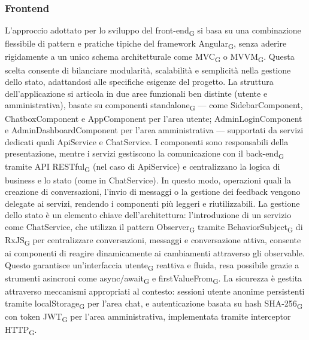 \subsubsection{Frontend}
L'approccio adottato per lo sviluppo del front-end\textsubscript{G} si basa su una combinazione flessibile di pattern e pratiche tipiche del framework Angular\textsubscript{G}, senza aderire rigidamente a un unico schema architetturale come MVC\textsubscript{G} o MVVM\textsubscript{G}. Questa scelta consente di bilanciare modularità, scalabilità e semplicità nella gestione dello stato, adattandosi alle specifiche esigenze del progetto. 
\newline \newline La struttura dell'applicazione si articola in due aree funzionali ben distinte (utente e amministrativa), basate su componenti standalone\textsubscript{G} — come SidebarComponent, ChatboxComponent e AppComponent per l'area utente; AdminLoginComponent e AdminDashboardComponent per l'area amministrativa — supportati da servizi dedicati quali ApiService e ChatService. I componenti sono responsabili della presentazione, mentre i servizi gestiscono la comunicazione con il back-end\textsubscript{G} tramite API RESTful\textsubscript{G} (nel caso di ApiService) e centralizzano la logica di business e lo stato (come in ChatService). 
\newline \newline In questo modo, operazioni quali la creazione di conversazioni, l'invio di messaggi o la gestione dei feedback vengono delegate ai servizi, rendendo i componenti più leggeri e riutilizzabili. La gestione dello stato è un elemento chiave dell'architettura: l'introduzione di un servizio come ChatService, che utilizza il pattern Observer\textsubscript{G} tramite BehaviorSubject\textsubscript{G} di RxJS\textsubscript{G} per centralizzare conversazioni, messaggi e conversazione attiva, consente ai componenti di reagire dinamicamente ai cambiamenti attraverso gli observable. Questo garantisce un'interfaccia utente\textsubscript{G} reattiva e fluida, resa possibile grazie a strumenti asincroni come async/await\textsubscript{G} e firstValueFrom\textsubscript{G}.
\newline \newline La sicurezza è gestita attraverso meccanismi appropriati al contesto: sessioni utente anonime persistenti tramite localStorage\textsubscript{G} per l'area chat, e autenticazione basata su hash SHA-256\textsubscript{G} con token JWT\textsubscript{G} per l'area amministrativa, implementata tramite interceptor HTTP\textsubscript{G}.
